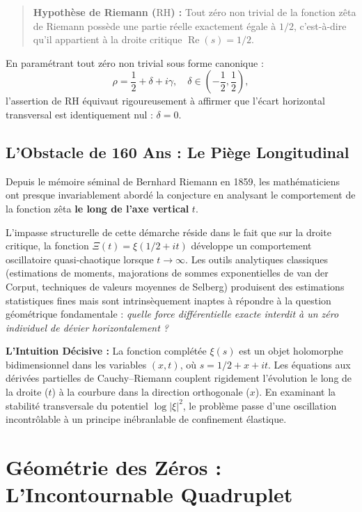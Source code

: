 \documentclass[11pt,a4paper]{article}
\theoremstyle{definition}
\theoremstyle{remark}
\begin{document}
\begin{quote}
\textbf{Hypothèse de Riemann ($\mathrm{RH}$) :} Tout zéro non trivial de la fonction zêta de Riemann possède une partie réelle exactement égale à $1/2$, c'est-à-dire qu'il appartient à la droite critique $\operatorname{Re}(s) = 1/2$.
\end{quote}

En paramétrant tout zéro non trivial sous forme canonique :
\begin{equation}
\rho = \frac{1}{2} + \delta + i\gamma, \quad \delta \in \left(-\frac{1}{2}, \frac{1}{2}\right),
\end{equation}
l'assertion de $\mathrm{RH}$ équivaut rigoureusement à affirmer que l'écart horizontal transversal est identiquement nul : $\delta = 0$.

\subsection{L'Obstacle de 160 Ans : Le Piège Longitudinal}
Depuis le mémoire séminal de Bernhard Riemann en 1859, les mathématiciens ont presque invariablement abordé la conjecture en analysant le comportement de la fonction zêta \textbf{le long de l'axe vertical} $t$.

L'impasse structurelle de cette démarche réside dans le fait que sur la droite critique, la fonction $\Xi(t) = \xi(1/2 + it)$ développe un comportement oscillatoire quasi-chaotique lorsque $t \to \infty$. Les outils analytiques classiques (estimations de moments, majorations de sommes exponentielles de van der Corput, techniques de valeurs moyennes de Selberg) produisent des estimations statistiques fines mais sont intrinsèquement inaptes à répondre à la question géométrique fondamentale : \emph{quelle force différentielle exacte interdit à un zéro individuel de dévier horizontalement ?}

\textbf{L'Intuition Décisive :} La fonction complétée $\xi(s)$ est un objet holomorphe bidimensionnel dans les variables $(x, t)$, où $s = 1/2 + x + it$. Les équations aux dérivées partielles de Cauchy--Riemann couplent rigidement l'évolution le long de la droite ($t$) à la courbure dans la direction orthogonale ($x$). En examinant la stabilité transversale du potentiel $\log |\xi|^2$, le problème passe d'une oscillation incontrôlable à un principe inébranlable de confinement élastique.

\section{Géométrie des Zéros : L'Incontournable Quadruplet}
\end{document}
